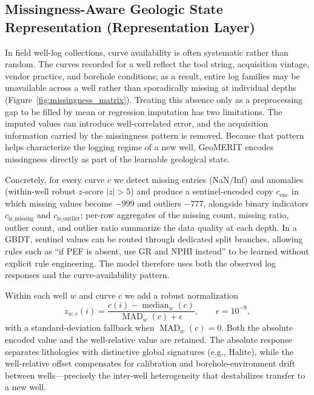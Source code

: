 \documentclass[bdcc,article,submit,pdftex,moreauthors]{Definitions/mdpi}
\begin{document}
\subsection{Missingness-Aware Geologic State Representation (Representation Layer)}
\label{sec:repr}
In field well-log collections, curve availability is often systematic rather than random. The
curves recorded for a well reflect the tool string, acquisition vintage, vendor practice, and
borehole conditions; as a result, entire log families may be unavailable across a well rather
than sporadically missing at individual depths (Figure~\ref{fig:missingness_matrix}). Treating
this absence only as a preprocessing gap to be filled by mean or regression imputation has two
limitations. The imputed values can introduce well-correlated error, and the acquisition
information carried by the missingness pattern is removed. Because that pattern helps
characterize the logging regime of a new well, GeoMERIT encodes missingness directly as part of
the learnable geological state.

Concretely, for every curve $c$ we detect missing entries (NaN/Inf) and anomalies (within-well
robust $z$-score $|z|>5$) and produce a sentinel-encoded copy $c_\text{enc}$ in which missing
values become $-999$ and outliers $-777$, alongside binary indicators $c_\text{is\_missing}$
and $c_\text{is\_outlier}$; per-row aggregates of the missing count, missing ratio, outlier
count, and outlier ratio summarize the data quality at each depth. In a GBDT, sentinel values
can be routed through dedicated split branches, allowing rules such as ``if PEF is absent,
use GR and NPHI instead'' to be learned without explicit rule engineering. The model therefore
uses both the observed log responses and the curve-availability pattern.

Within each well $w$ and curve $c$ we add a robust normalization
\begin{equation}
z_{w,c}(i) = \frac{c(i)-\operatorname{median}_w(c)}{\operatorname{MAD}_w(c)+\epsilon},\qquad \epsilon=10^{-9},
\label{eq:zscore}
\end{equation}
with a standard-deviation fallback when $\operatorname{MAD}_w(c)=0$. Both the absolute
encoded value and the well-relative value are retained. The absolute response separates
lithologies with distinctive global signatures (e.g., Halite), while the well-relative offset
compensates for calibration and borehole-environment drift between wells---precisely the
inter-well heterogeneity that destabilizes transfer to a new well.
\end{document}
